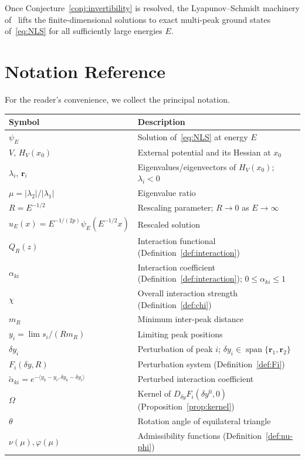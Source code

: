 \documentclass[11pt]{article}
\theoremstyle{plain}%
\theoremstyle{definition}%
\theoremstyle{definition}%
\theoremstyle{remark}%
\numberwithin{equation}{section}
\newcommand{\HV}{H_V}
\newcommand{\ip}[2]{\langle #1, #2 \rangle}
\begin{document}
Once Conjecture~\ref{conj:invertibility} is resolved, the Lyapunov--Schmidt machinery of~\cite{KirrNatarajan2018} lifts the finite-dimensional solutions to exact multi-peak ground states of~\eqref{eq:NLS} for all sufficiently large energies $E$.







\appendix
\section{Notation Reference}\label{app:notation}

For the reader's convenience, we collect the principal notation.

\medskip
\begin{tabular}{ll}
\toprule
Symbol & Description \\
\midrule
$\psi_E$ & Solution of~\eqref{eq:NLS} at energy $E$ \\
$V$, $\HV(x_0)$ & External potential and its Hessian at $x_0$ \\
$\lambda_i$, $\boldsymbol{r}_i$ & Eigenvalues/eigenvectors of $\HV(x_0)$; $\lambda_i<0$ \\
$\mu = |\lambda_2|/|\lambda_1|$ & Eigenvalue ratio \\
$R = E^{-1/2}$ & Rescaling parameter; $R\to 0$ as $E\to\infty$ \\
$u_E(x) = E^{-1/(2p)}\psi_E(E^{-1/2}x)$ & Rescaled solution \\
$Q_R(z)$ & Interaction functional (Definition~\ref{def:interaction}) \\
$\alpha_{ki}$ & Interaction coefficient (Definition~\ref{def:interaction}); $0\leq\alpha_{ki}\leq 1$ \\
$\chi$ & Overall interaction strength (Definition~\ref{def:chi}) \\
$m_R$ & Minimum inter-peak distance \\
$y_i = \lim s_i/(Rm_R)$ & Limiting peak positions \\
$\delta y_i$ & Perturbation of peak $i$; $\delta y_i\in\operatorname{span}\{\boldsymbol{r}_1,\boldsymbol{r}_2\}$ \\
$F_i(\delta y,R)$ & Perturbation system (Definition~\ref{def:Fi}) \\
$\tilde{\alpha}_{ki} = e^{-\ip{y_k-y_i}{\delta y_k-\delta y_i}}$ & Perturbed interaction coefficient \\
$\Omega$ & Kernel of $D_{\delta y}F_i(\delta y^0,0)$ (Proposition~\ref{prop:kernel}) \\
$\theta$ & Rotation angle of equilateral triangle \\
$\nu(\mu),\varphi(\mu)$ & Admissibility functions (Definition~\ref{def:nu-phi}) \\
\bottomrule
\end{tabular}
\end{document}
